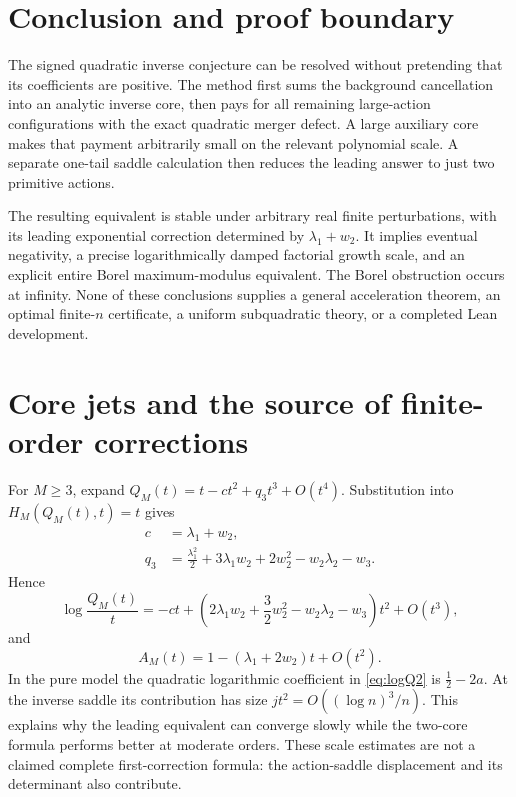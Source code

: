 \documentclass[11pt,a4paper]{article}
\numberwithin{equation}{section}
\theoremstyle{definition}
\theoremstyle{remark}\newtheorem{remark}[theorem]{Remark}
\begin{document}
\section{Conclusion and proof boundary}
The signed quadratic inverse conjecture can be resolved without pretending
that its coefficients are positive. The method first sums the background
cancellation into an analytic inverse core, then pays for all remaining
large-action configurations with the exact quadratic merger defect.
A large auxiliary core makes that payment arbitrarily small on the relevant
polynomial scale. A separate one-tail saddle calculation then reduces the
leading answer to just two primitive actions.

The resulting equivalent is stable under arbitrary real finite perturbations,
with its leading exponential correction determined by $\lambda_1+w_2$.
It implies eventual negativity, a precise logarithmically damped factorial
growth scale, and an explicit entire Borel maximum-modulus equivalent.
The Borel obstruction occurs at infinity. None of these conclusions supplies
a general acceleration theorem, an optimal finite-$n$ certificate, a uniform
subquadratic theory, or a completed Lean development.

\appendix
\section{Core jets and the source of finite-order corrections}
\label{app:jets}
For $M\ge3$, expand $Q_M(t)=t-ct^2+q_3t^3+O(t^4)$.
Substitution into $H_M(Q_M(t),t)=t$ gives
\begin{align}
 c&=\lambda_1+w_2,\\
 q_3&=\frac{\lambda_1^2}{2}+3\lambda_1w_2+2w_2^2-w_2\lambda_2-w_3.
\end{align}
Hence
\begin{equation}
 \log\frac{Q_M(t)}t=-ct+
 \left(2\lambda_1w_2+\frac32w_2^2-w_2\lambda_2-w_3\right)t^2+O(t^3),
 \label{eq:logQ2}
\end{equation}
and
\begin{equation}
 A_M(t)=1-(\lambda_1+2w_2)t+O(t^2).
\end{equation}
In the pure model the quadratic logarithmic coefficient in
\eqref{eq:logQ2} is $\tfrac12-2a$.
At the inverse saddle its contribution has size
$j t^2=O((\log n)^3/n)$. This explains why the leading equivalent can
converge slowly while the two-core formula performs better at moderate
orders. These scale estimates are not a claimed complete first-correction
formula: the action-saddle displacement and its determinant also contribute.
\end{document}
